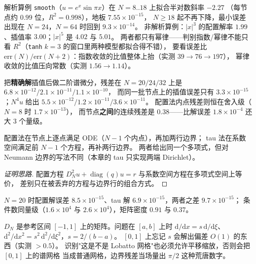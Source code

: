 \begin{remark}[实测：斜率、地板、以及撞上地板的 $N$]
解析算例 \texttt{smooth}（$u=e^x\sin\pi x$）在 $N=8..18$ 上拟合半对数斜率 $-2.27$
（每节点约 $0.99$ 位，$R^2=0.998$），地板 $7.55\times10^{-15}$，
$N\ge18$ 起不再下降，最小误差出现在 $N=24$，$N=64$ 时回到 $9.3\times10^{-14}$。
非解析算例：$|x|^3$ 的配置解率 $1.99$、插值率 $3.00$；$|x|^5$ 是 $4.02$ 与 $5.01$。
两者都只有幂律——判别指数/幂律不能只看 $R^2$（\texttt{tanh} $k=3$ 的窗口里两种模型都拟合得不错），
要看误差比 $\mathrm{err}(N)/\mathrm{err}(N+2)$：指数收敛的比值整体上抬（实测 $39\to76\to197$），
幂律收敛的比值压向常数（实测 $1.56\to1.14$）。
\end{remark}

\begin{remark}[实测：舍入地板是 $N^4u$]
把\textbf{精确解}插值后做二阶谱微分，残差在 $N=20/24/32$ 上是
$6.8\times10^{-12}/2.1\times10^{-11}/1.1\times10^{-10}$，
而同一批节点上的插值误差只有 $3.3\times10^{-15}$；$N^4u$ 给出
$5.5\times10^{-12}/1.2\times10^{-11}/3.6\times10^{-11}$。
配置法内点残差则恒在舍入级（$N=8$ 时 $1.7\times10^{-13}$），
而节点\textbf{之间}的连续残差是 $0.38$——比解误差 $1.8\times10^{-4}$ 还大 3 个量级。
\end{remark}

\begin{theorem}
配置法在节点上逐点满足 ODE（$N-1$ 个内点），再加两行边界；
tau 法在系数空间满足前 $N-1$ 个方程，再补两行边界。
两者给出同一个多项式，但对 Neumann 边界的写法不同（本章的 tau 只实现两端 Dirichlet）。
\end{theorem}
\begin{proof}[证明思路]
配置方程 $D_N^2u+\operatorname{diag}(q)u=r$ 与系数空间方程在多项式空间上等价，
差别只在被丢弃的方程与边界行的组合方式。
\end{proof}

\begin{remark}
$N=20$ 时配置解误差 $8.5\times10^{-15}$、tau 解 $6.9\times10^{-15}$，两者之差 $9.7\times10^{-15}$；
条件数同量级（$1.6\times10^{4}$ 与 $2.6\times10^{4}$），矩阵密度 $0.91$ 与 $0.37$。
\end{remark}

\begin{remark}[区间映射的伸缩因子]
$D_N$ 是参考区间 $[-1,1]$ 上的矩阵。问题在 $[a,b]$ 上时
$\mathrm{d}/\mathrm{d}x=s\,\mathrm{d}/\mathrm{d}\xi$、
$\mathrm{d}^2/\mathrm{d}x^2=s^2\,\mathrm{d}^2/\mathrm{d}\xi^2$，$s=2/(b-a)$。
$[0,1]$ 上忘记 $s$ 会解出偏差 $O(1)$ 的东西（实测 $>0.5$）。
识别"这是不是 Lobatto 网格"也必须允许平移缩放，否则会把 $[0,1]$ 上的谱网格
当成普通网格，边界残差当场量出 $\pi/2$ 这种荒唐数字。
\end{remark}


